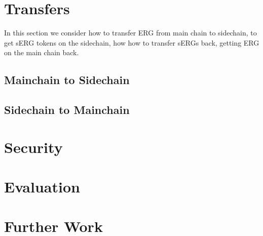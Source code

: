 \documentclass{article}   %
\begin{document}
\section{Transfers}

In this section we consider how to transfer ERG from main chain to sidechain, to get sERG tokens on the sidechain, how
how to transfer sERGs back, getting ERG on the main chain back.

\subsection{Mainchain to Sidechain}

\subsection{Sidechain to Mainchain}

\section{Security}

\section{Evaluation}

\section{Further Work}



\newpage

 
\end{document}

